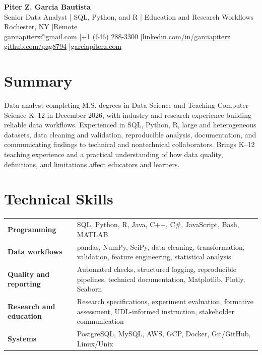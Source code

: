 \documentclass[10pt,letterpaper]{article}
\begin{document}
\fontsize{9}{10.35}\selectfont

\begin{center}
  {\Large\bfseries Piter Z. Garcia Bautista}\\[1pt]
  {\large Senior Data Analyst | SQL, Python, and R | Education and Research Workflows}\\[2pt]
  Rochester, NY \enspace|\enspace Remote\\
  \href{mailto:garciapiterz@gmail.com}{garciapiterz@gmail.com}
  \enspace|\enspace +1 (646) 288-3300
  \enspace|\enspace \href{https://linkedin.com/in/garciapiterz}{linkedin.com/in/garciapiterz}\\
  \href{https://github.com/pzg8794}{github.com/pzg8794}
  \enspace|\enspace \href{https://garciapiterz.com}{garciapiterz.com}
\end{center}

\section*{Summary}
Data analyst completing M.S. degrees in Data Science and Teaching Computer
Science K--12 in December 2026, with industry and research experience building
reliable data workflows. Experienced in SQL, Python, R, large and heterogeneous
datasets, data cleaning and validation, reproducible analysis, documentation,
and communicating findings to technical and nontechnical collaborators. Brings
K--12 teaching experience and a practical understanding of how data quality,
definitions, and limitations affect educators and learners.

\section*{Technical Skills}
\begin{tabularx}{\textwidth}{@{}>{\bfseries}l X@{}}
Programming & SQL, Python, R, Java, C++, C\#, JavaScript, Bash, MATLAB\\
Data workflows & pandas, NumPy, SciPy, data cleaning, transformation, validation, feature engineering, statistical analysis\\
Quality and reporting & Automated checks, structured logging, reproducible pipelines, technical documentation, Matplotlib, Plotly, Seaborn\\
Research and education & Research specifications, experiment evaluation, formative assessment, UDL-informed instruction, stakeholder communication\\
Systems & PostgreSQL, MySQL, AWS, GCP, Docker, Git/GitHub, Linux/Unix\\
\end{tabularx}
\end{document}
